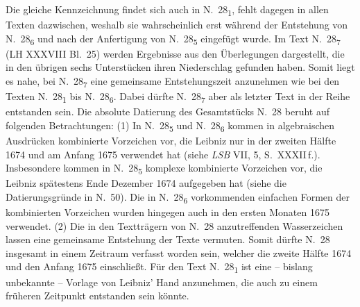 Die gleiche Kennzeichnung findet sich auch in N.~28\textsubscript{1}, fehlt dagegen in allen Texten dazwischen,
weshalb sie wahrscheinlich erst w\"{a}hrend der Entstehung von N.~28\textsubscript{6} und nach der Anfertigung von N.~28\textsubscript{5} eingefügt wurde.
\pend\pstart%
Im Text N.~28\textsubscript{7} (LH XXXVIII Bl.~25) 
werden Ergebnisse aus den Überlegungen dargestellt,
die in den übrigen sechs Unterstücken ihren Niederschlag gefunden haben.
Somit liegt es nahe, bei N.~28\textsubscript{7} eine gemeinsame Entstehungszeit anzunehmen wie bei den Texten N.~28\textsubscript{1} bis N.~28\textsubscript{6}.
Dabei dürfte N.~28\textsubscript{7} aber als letzter Text in der Reihe entstanden sein.
\pend\pstart%
Die absolute Datierung des Gesamtstücks N.~28 beruht auf folgenden Betrachtungen:
(1) In N.~28\textsubscript{5} und N.~28\textsubscript{6} kommen in algebraischen Ausdrücken kombinierte Vorzeichen vor,
die Leibniz nur in der zweiten H\"{a}lfte 1674 und am Anfang 1675 verwendet hat (siehe \textit{LSB} VII, 5, S.~XXXII\,f.).
Insbesondere kommen in N.~28\textsubscript{5} komplexe kombinierte Vorzeichen vor,
die Leibniz spätestens Ende Dezember 1674 aufgegeben hat (siehe die Datierungsgründe in N.~50).
Die in N.~28\textsubscript{6} vorkommenden einfachen Formen der kombinierten Vorzeichen wurden hingegen auch in den ersten Monaten 1675 verwendet.
(2) Die in den Textträgern von N.~28 anzutreffenden Wasserzeichen lassen eine gemeinsame Entstehung der Texte vermuten.
Somit dürfte N.~28 insgesamt in einem Zeitraum verfasst worden sein, welcher die zweite Hälfte 1674 und den Anfang 1675 einschließt.
\pend\pstart%
F\"{u}r den Text N.~28\textsubscript{1} ist eine -- bislang unbekannte -- Vorlage von Leibniz' Hand anzunehmen,
die auch zu einem früheren Zeitpunkt entstanden sein könnte.
\pend%
\normalsize%
